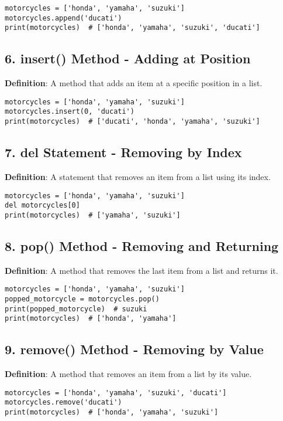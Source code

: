 \begin{lstlisting}
motorcycles = ['honda', 'yamaha', 'suzuki']
motorcycles.append('ducati')
print(motorcycles)  # ['honda', 'yamaha', 'suzuki', 'ducati']
\end{lstlisting}

\subsection*{6. insert() Method - Adding at Position}
\textbf{Definition}: A method that adds an item at a specific position in a list.

\begin{lstlisting}
motorcycles = ['honda', 'yamaha', 'suzuki']
motorcycles.insert(0, 'ducati')
print(motorcycles)  # ['ducati', 'honda', 'yamaha', 'suzuki']
\end{lstlisting}

\subsection*{7. del Statement - Removing by Index}
\textbf{Definition}: A statement that removes an item from a list using its index.

\begin{lstlisting}
motorcycles = ['honda', 'yamaha', 'suzuki']
del motorcycles[0]
print(motorcycles)  # ['yamaha', 'suzuki']
\end{lstlisting}

\subsection*{8. pop() Method - Removing and Returning}
\textbf{Definition}: A method that removes the last item from a list and returns it.

\begin{lstlisting}
motorcycles = ['honda', 'yamaha', 'suzuki']
popped_motorcycle = motorcycles.pop()
print(popped_motorcycle)  # suzuki
print(motorcycles)  # ['honda', 'yamaha']
\end{lstlisting}

\subsection*{9. remove() Method - Removing by Value}
\textbf{Definition}: A method that removes an item from a list by its value.

\begin{lstlisting}
motorcycles = ['honda', 'yamaha', 'suzuki', 'ducati']
motorcycles.remove('ducati')
print(motorcycles)  # ['honda', 'yamaha', 'suzuki']
\end{lstlisting}

